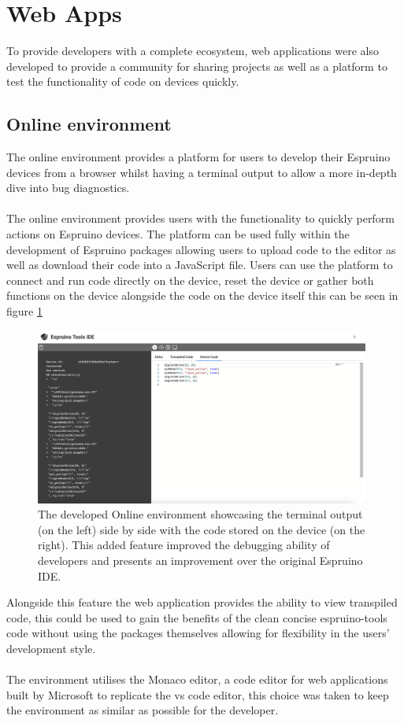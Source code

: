 \documentclass{l4proj}
\begin{document}
\section{Web Apps}
To provide developers with a complete ecosystem, web applications were also developed to provide a community for sharing projects as well as a platform to test the functionality of code on devices quickly.

\subsection{Online environment}
The online environment provides a platform for users to develop their Espruino devices from a browser whilst having a terminal output to allow a more in-depth dive into bug diagnostics.
\\ \\
The online environment provides users with the functionality to quickly perform actions on Espruino devices. The platform can be used fully within the development of Espruino packages allowing users to upload code to the editor as well as download their code into a JavaScript file. Users can use the platform to connect and run code directly on the device, reset the device or gather both functions on the device alongside the code on the device itself this can be seen in figure \ref{fig:online-env-device-code}

\begin{figure}[!ht]
    \centering
    \includegraphics[width=11cm]{dissertation/images/online-env-device-code.png}
    \caption{The developed Online environment showcasing the terminal output (on the left) side by side with the code stored on the device (on the right). This added feature improved the debugging ability of developers and presents an improvement over the original Espruino IDE.}
    \label{fig:online-env-device-code}
\end{figure}

Alongside this feature the web application provides the ability to view transpiled code, this could be used to gain the benefits of the clean concise espruino-tools code without using the packages themselves allowing for flexibility in the users' development style.
\\ \\
The environment utilises the Monaco editor, a code editor for web applications built by Microsoft to replicate the vs code editor, this choice was taken to keep the environment as similar as possible for the developer.
\end{document}
